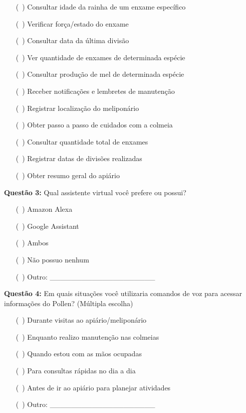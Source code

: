 \begin{itemize}
    \item[($\,\,\,$)] Consultar idade da rainha de um enxame específico
    \item[($\,\,\,$)] Verificar força/estado do enxame
    \item[($\,\,\,$)] Consultar data da última divisão
    \item[($\,\,\,$)] Ver quantidade de enxames de determinada espécie
    \item[($\,\,\,$)] Consultar produção de mel de determinada espécie
    \item[($\,\,\,$)] Receber notificações e lembretes de manutenção
    \item[($\,\,\,$)] Registrar localização do meliponário
    \item[($\,\,\,$)] Obter passo a passo de cuidados com a colmeia
    \item[($\,\,\,$)] Consultar quantidade total de enxames
    \item[($\,\,\,$)] Registrar datas de divisões realizadas
    \item[($\,\,\,$)] Obter resumo geral do apiário
\end{itemize}

\vspace{1em}

\textbf{Questão 3:} Qual assistente virtual você prefere ou possui?

\begin{itemize}
    \item[($\,\,\,$)] Amazon Alexa
    \item[($\,\,\,$)] Google Assistant
    \item[($\,\,\,$)] Ambos
    \item[($\,\,\,$)] Não possuo nenhum
    \item[($\,\,\,$)] Outro: \_\_\_\_\_\_\_\_\_\_\_\_\_\_\_\_\_\_\_\_
\end{itemize}

\vspace{1em}

\textbf{Questão 4:} Em quais situações você utilizaria comandos de voz para acessar informações do Pollen? (Múltipla escolha)

\begin{itemize}
    \item[($\,\,\,$)] Durante visitas ao apiário/meliponário
    \item[($\,\,\,$)] Enquanto realizo manutenção nas colmeias
    \item[($\,\,\,$)] Quando estou com as mãos ocupadas
    \item[($\,\,\,$)] Para consultas rápidas no dia a dia
    \item[($\,\,\,$)] Antes de ir ao apiário para planejar atividades
    \item[($\,\,\,$)] Outro: \_\_\_\_\_\_\_\_\_\_\_\_\_\_\_\_\_\_\_\_
\end{itemize}

